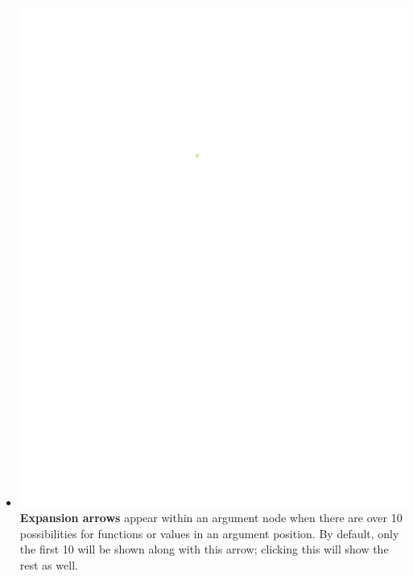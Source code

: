 \documentclass[conference]{IEEEtran}
\begin{document}
\begin{itemize}
		\item  \vspace{.15cm} \includegraphics{glossary-arrow} \textbf{Expansion
			arrows} appear within an argument node when there are over 10 possibilities for
		functions or values in an argument position. By default, only the first 10
		will be shown along with this arrow; clicking this will show the rest as well.
		

\end{itemize}
\end{document}
